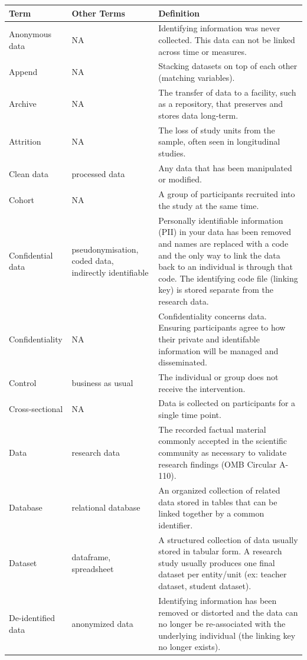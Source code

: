 \documentclass[
]{book}
\begin{document}
\begin{longtable}{lll}
\toprule
Term & Other Terms & Definition \\ 
\midrule
Anonymous data & NA & Identifying information was never collected. This data can not be linked across time or measures. \\ 
Append & NA & Stacking datasets on top of each other (matching variables). \\ 
Archive & NA & The transfer of data to a facility, such as a repository, that preserves and stores data long-term. \\ 
Attrition & NA & The loss of study units from the sample, often seen in longitudinal studies. \\ 
Clean data & processed data & Any data that has been manipulated or modified. \\ 
Cohort & NA & A group of participants recruited into the study at the same time. \\ 
Confidential data & pseudonymisation, coded data, indirectly identifiable & Personally identifiable information (PII) in your data has been removed and names are replaced with a code and the only way to link the data back to an individual is through that code. The identifying code file (linking key) is stored separate from the research data. \\ 
Confidentiality & NA & Confidentiality concerns data. Ensuring participants agree to how their private and identifable information will be managed and disseminated. \\ 
Control & business as usual & The individual or group does not receive the intervention. \\ 
Cross-sectional & NA & Data is collected on participants for a single time point. \\ 
Data & research data & The recorded factual material commonly accepted in the scientific community as necessary to validate research findings (OMB Circular A-110). \\ 
Database & relational database & An organized collection of related data stored in tables that can be linked together by a common identifier. \\ 
Dataset & dataframe, spreadsheet & A structured collection of data usually stored in tabular form. A research study usually produces one final dataset per entity/unit (ex: teacher dataset, student dataset). \\ 
De-identified data & anonymized data & Identifying information has been removed or distorted and the data can no longer be re-associated with the underlying individual (the linking key no longer exists). \\ 

\end{longtable}
\end{document}
